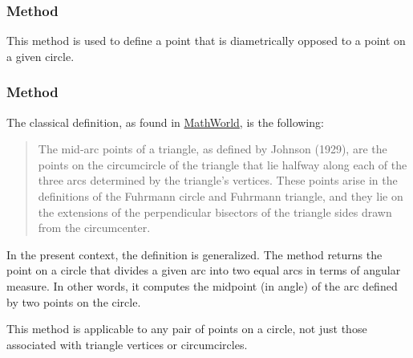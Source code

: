 \subsubsection{Method } %
\label{ssub:method_circle_antipode}
This method is used to define a point that is diametrically opposed to a point on a given circle.

\vspace{1em}
\begin{tkzexample}[latex=.5\textwidth]
\begin{center}
\end{center}
\end{tkzexample}

\subsubsection{Method } %
\label{ssub:method_circle_midarc}

The classical definition, as found in \href{https://mathworld.wolfram.com/Mid-ArcPoints.html}{MathWorld}, is the following:

\medskip
\begin{quote}
The mid-arc points of a triangle, as defined by Johnson (1929), are the points on the circumcircle of the triangle that lie halfway along each of the three arcs determined by the triangle's vertices. These points arise in the definitions of the Fuhrmann circle and Fuhrmann triangle, and they lie on the extensions of the perpendicular bisectors of the triangle sides drawn from the circumcenter.
\end{quote}

\medskip
\noindent
In the present context, the definition is generalized. The method returns the point on a circle that divides a given arc into two equal arcs in terms of angular measure. In other words, it computes the midpoint (in angle) of the arc defined by two points on the circle.

\medskip
\noindent
This method is applicable to any pair of points on a circle, not just those associated with triangle vertices or circumcircles.

